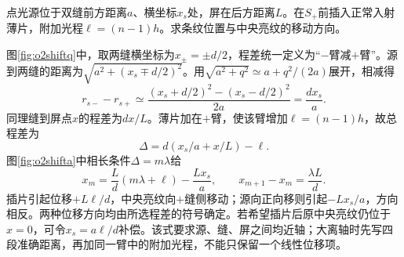 \begin{example}\label{ex:o2shift}
点光源位于双缝前方距离$a$、横坐标$x_s$处，屏在后方距离$L$。在$S_+$前插入正常入射薄片，附加光程$\ell=(n-1)h$。求条纹位置与中央亮纹的移动方向。
\end{example}
\begin{solution}
图\ref{fig:o2shiftq}中，取两缝横坐标为$x_\pm=\pm d/2$，程差统一定义为“$-$臂减$+$臂”。源到两缝的距离为$\sqrt{a^2+(x_s\mp d/2)^2}$。用$\sqrt{a^2+q^2}\simeq a+q^2/(2a)$展开，相减得
\[
 r_{s-}-r_{s+}\simeq
 \frac{(x_s+d/2)^2-(x_s-d/2)^2}{2a}=\frac{dx_s}a.
\]
同理缝到屏点$x$的程差为$dx/L$。薄片加在$+$臂，使该臂增加$\ell=(n-1)h$，故总程差为
\[
 \Delta=d(x_s/a+x/L)-\ell.
\]
图\ref{fig:o2shifta}中相长条件$\Delta=m\lambda$给
\[
 x_m=\frac Ld(m\lambda+\ell)-\frac{Lx_s}a,
 \qquad x_{m+1}-x_m=\frac{\lambda L}d.
\]
插片引起位移$+L\ell/d$，中央亮纹向$+$缝侧移动；源向正向移则引起$-Lx_s/a$，方向相反。两种位移方向均由所选程差的符号确定。若希望插片后原中央亮纹仍位于$x=0$，可令$x_s=a\ell/d$补偿。该式要求源、缝、屏之间均近轴；大离轴时先写四段准确距离，再加同一臂中的附加光程，不能只保留一个线性位移项。
\end{solution}

